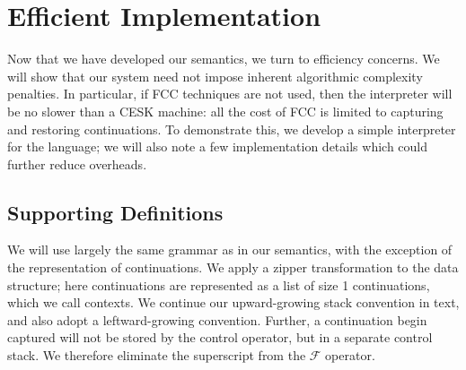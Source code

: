 \documentclass[11pt]{article}
\newcommand{\maybePage}{\newpage}
\newcommand\F{\mathcal{F}}
\begin{document}




%

\maybePage
\section{Efficient Implementation}

Now that we have developed our semantics, we turn to efficiency concerns.
We will show that our system need not impose inherent algorithmic complexity penalties.
In particular, if FCC techniques are not used, then the interpreter will be no slower than a CESK machine: all the cost of FCC is limited to capturing and restoring continuations.
To demonstrate this, we develop a simple interpreter for the language; we will also note a few implementation details which could further reduce overheads.

\maybePage
\subsection{Supporting Definitions}

We will use largely the same grammar as in our semantics, with the exception of the representation of continuations.
We apply a zipper transformation to the data structure; here continuations are represented as a list of size 1 continuations, which we call contexts.
We continue our upward-growing stack convention in text, and also adopt a leftward-growing convention.
Further, a continuation begin captured will not be stored by the control operator, but in a separate control stack.
We therefore eliminate the superscript from the $\F$ operator.
\end{document}
